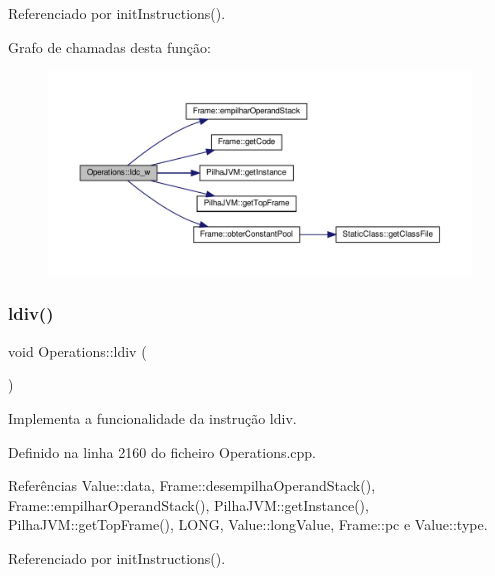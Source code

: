 Referenciado por init\+Instructions().

Grafo de chamadas desta função\+:\nopagebreak
\begin{figure}[H]
\begin{center}
\leavevmode
\includegraphics[width=350pt]{classOperations_a081fd22827f77e8ce5219275256cc831_cgraph}
\end{center}
\end{figure}
\mbox{\label{classOperations_ab9bb90a9db0433e1d04b0eb9bceea9f4}} 
\subsubsection{\texorpdfstring{ldiv()}{ldiv()}}
{\footnotesize\ttfamily void Operations\+::ldiv (\begin{DoxyParamCaption}{ }\end{DoxyParamCaption})\hspace{0.3cm}{\ttfamily [private]}}



Implementa a funcionalidade da instrução ldiv. 



Definido na linha 2160 do ficheiro Operations.\+cpp.



Referências Value\+::data, Frame\+::desempilha\+Operand\+Stack(), Frame\+::empilhar\+Operand\+Stack(), Pilha\+J\+V\+M\+::get\+Instance(), Pilha\+J\+V\+M\+::get\+Top\+Frame(), L\+O\+NG, Value\+::long\+Value, Frame\+::pc e Value\+::type.



Referenciado por init\+Instructions().

